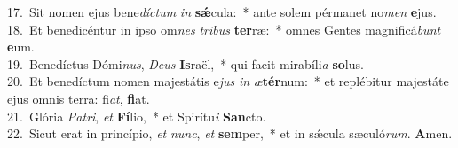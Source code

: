 {17.~}Sit nomen ejus bene\textit{dí}\textit{ctum} \textit{in} \textbf{sǽ}cula:~* ante solem pérmanet no\textit{men} \textbf{e}jus.\\
{18.~}Et benedicéntur in ipso om\textit{nes} \textit{tri}\textit{bus} \textbf{ter}ræ:~* omnes Gentes magnificá\textit{bunt} \textbf{e}um.\\
{19.~}Benedíctus Dómi\textit{nus}, \textit{De}\textit{us} \textbf{Is}raël,~* qui facit mirabíli\textit{a} \textbf{so}lus.\\
{20.~}Et benedíctum nomen majestátis e\textit{jus} \textit{in} \textit{æ}\textbf{tér}num:~* et replébitur majestáte ejus omnis terra: fi\textit{at}, \textbf{fi}at.\\
{21.~}Glória \textit{Pa}\textit{tri}, \textit{et} \textbf{Fí}lio,~* et Spirítu\textit{i} \textbf{San}cto.\\
{22.~}Sicut erat in princípio, \textit{et} \textit{nunc}, \textit{et} \textbf{sem}per,~* et in sǽcula sæculó\textit{rum}. \textbf{A}men.\\
